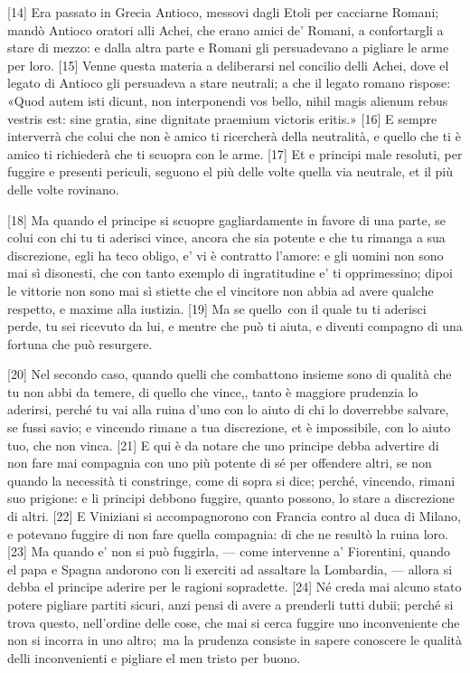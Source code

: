 {[}14{]} Era passato in Grecia Antioco, messovi dagli Etoli per
cacciarne Romani; mandò Antioco oratori alli Achei, che erano amici de'
Romani, a confortargli a stare di mezzo: e dalla altra parte e Romani
gli persuadevano a pigliare le arme per loro. {[}15{]} Venne questa
materia a deliberarsi nel concilio delli Achei, dove el legato di
Antioco gli persuadeva a stare neutrali; a che il legato romano rispose:
«Quod autem isti dicunt, non interponendi vos bello, nihil magis alienum
rebus vestris est: sine gratia, sine dignitate praemium victoris
eritis.» {[}16{]} E sempre interverrà che colui che non è amico ti
ricercherà della neutralità, e quello che ti è amico ti richiederà che
ti scuopra con le arme. {[}17{]} Et e principi male resoluti, per
fuggire e presenti periculi, seguono el più delle volte quella via
neutrale, et il più delle volte rovinano.

{[}18{]} Ma quando el principe si scuopre gagliardamente in favore di
una parte, se colui con chi tu ti aderisci vince, ancora che sia potente
e che tu rimanga a sua discrezione, egli ha teco obligo, e' vi è
contratto l'amore: e gli uomini non sono mai sì disonesti, che con tanto
exemplo di ingratitudine e' ti opprimessino; dipoi le vittorie non sono
mai sì stiette che el vincitore non abbia ad avere qualche respetto, e
maxime alla iustizia. {[}19{]} Ma se quello\est\ con il quale tu ti aderisci
perde, tu sei ricevuto da lui, e mentre che può ti aiuta, e diventi
compagno di una fortuna che può resurgere.

{[}20{]} Nel secondo caso, quando quelli che combattono insieme sono di
qualità che tu non abbi da temere, di quello che vince,, tanto è
maggiore prudenzia lo aderirsi, perché tu vai alla ruina d'uno con lo
aiuto di chi lo doverrebbe salvare, se fussi savio; e vincendo rimane a
tua discrezione, et è impossibile, con lo aiuto tuo, che non vinca.
{[}21{]} E qui è da notare che uno principe debba advertire di non fare
mai compagnia con uno più potente di sé per offendere altri, se non
quando la necessità ti constringe, come di sopra si dice; perché,
vincendo, rimani suo prigione: e li principi debbono fuggire, quanto
possono, lo stare a discrezione di altri. {[}22{]} E Viniziani si
accompagnorono con Francia contro al duca di Milano, e potevano fuggire
di non fare quella compagnia: di che ne resultò la ruina loro. {[}23{]}
Ma quando e' non si può fuggirla, --- come intervenne a' Fiorentini,
quando el papa e Spagna andorono con li exerciti ad assaltare la
Lombardia, --- allora si debba el principe aderire per le ragioni sopradette. {[}24{]} Né creda mai alcuno stato potere pigliare partiti sicuri, anzi pensi di avere a prenderli tutti dubii; perché si trova questo, nell'ordine delle cose, che mai si cerca fuggire uno inconveniente che non si incorra in uno altro;\est\ ma la prudenza consiste in sapere conoscere le qualità delli inconvenienti e pigliare el men tristo per buono.


